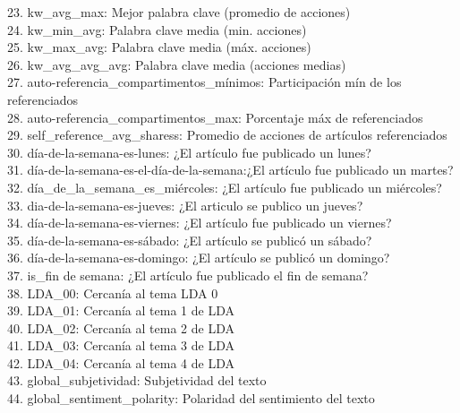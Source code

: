 		23. kw\_avg\_max:                   		\hfill Mejor palabra clave (promedio de acciones) \\
		24. kw\_min\_avg:							\hfill Palabra clave media (min. acciones) \\
		25. kw\_max\_avg:							\hfill Palabra clave media (máx. acciones) \\
		26. kw\_avg\_avg\_avg:						\hfill Palabra clave media (acciones medias) \\
		27. auto-referencia\_compartimentos\_mínimos: \hfill Participación mín de los referenciados \\
		28. auto-referencia\_compartimentos\_max:     \hfill Porcentaje máx de referenciados \\
		29. self\_reference\_avg\_sharess:   			\hfill Promedio de acciones de artículos referenciados \\
		30. día-de-la-semana-es-lunes:            	\hfill ¿El artículo fue publicado un lunes? \\
		31. día-de-la-semana-es-el-día-de-la-semana:\hfill ¿El artículo fue publicado un martes? \\
		32. día\_de\_la\_semana\_es\_miércoles:          \hfill ¿El artículo fue publicado un miércoles? \\
		33. dia-de-la-semana-es-jueves:		 		\hfill ¿El articulo se publico un jueves? \\
		34. día-de-la-semana-es-viernes:            \hfill ¿El artículo fue publicado un viernes? \\
		35. día-de-la-semana-es-sábado:          	\hfill ¿El artículo se publicó un sábado? \\
		36. día-de-la-semana-es-domingo:            \hfill ¿El artículo se publicó un domingo? \\
		37. is\_fin de semana:                   	\hfill ¿El artículo fue publicado el fin de semana? \\
		38. LDA\_00:									\hfill Cercanía al tema LDA 0 \\
		39. LDA\_01:									\hfill Cercanía al tema 1 de LDA \\
		40. LDA\_02:									\hfill Cercanía al tema 2 de LDA \\
		41. LDA\_03:									\hfill Cercanía al tema 3 de LDA \\
		42. LDA\_04:									\hfill Cercanía al tema 4 de LDA \\
		43. global\_subjetividad:          			\hfill Subjetividad del texto \\
		44. global\_sentiment\_polarity:    			\hfill Polaridad del sentimiento del texto \\

